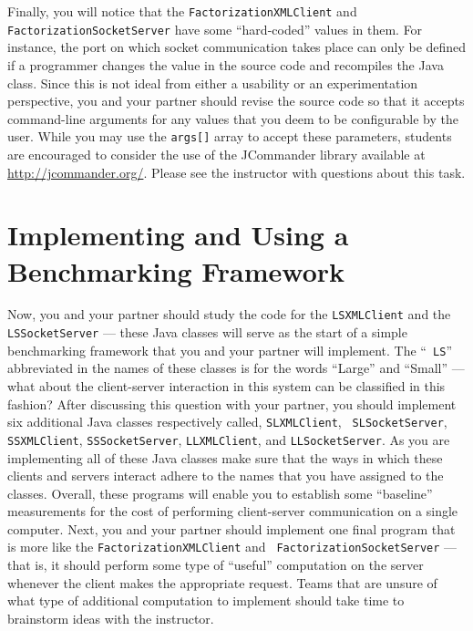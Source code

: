 Finally, you will notice that the {\tt FactorizationXMLClient} and {\tt FactorizationSocketServer} have some
``hard-coded'' values in them. For instance, the port on which socket communication takes place can only be defined if a
programmer changes the value in the source code and recompiles the Java class. Since this is not ideal from either a
usability or an experimentation perspective, you and your partner should revise the source code so that it accepts
command-line arguments for any values that you deem to be configurable by the user. While you may use the {\tt args[]}
array to accept these parameters, students are encouraged to consider the use of the JCommander library available at
\url{http://jcommander.org/}. Please see the instructor with questions about this task.

\section*{Implementing and Using a Benchmarking Framework}

Now, you and your partner should study the code for the {\tt LSXMLClient} and the {\tt LSSocketServer} --- these Java
classes will serve as the start of a simple benchmarking framework that you and your partner will implement. The ``{\tt
LS}'' abbreviated in the names of these classes is for the words ``Large'' and ``Small'' --- what about the
client-server interaction in this system can be classified in this fashion? After discussing this question with your
partner, you should implement six additional Java classes respectively called, {\tt SLXMLClient}, {\tt
SLSocketServer}, {\tt SSXMLClient}, {\tt SSSocketServer}, {\tt LLXMLClient}, and {\tt LLSocketServer}. As you are
implementing all of these Java classes make sure that the ways in which these clients and servers interact adhere to the
names that you have assigned to the classes. Overall, these programs will enable you to establish some ``baseline''
measurements for the cost of performing client-server communication on a single computer. Next, you and your partner
should implement one final program that is more like the {\tt FactorizationXMLClient} and {\tt
FactorizationSocketServer} --- that is, it should perform some type of ``useful'' computation on the server whenever the
client makes the appropriate request. Teams that are unsure of what type of additional computation to
implement should take time to brainstorm ideas with the instructor.

